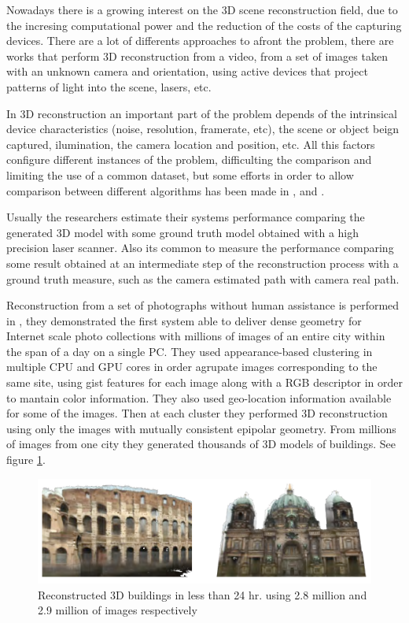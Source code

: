  
Nowadays there is a growing interest on the 3D scene reconstruction field, due to the incresing computational power and the reduction of 
the costs of the capturing devices. There are a lot of differents approaches to afront the problem, there are works that perform 3D reconstruction 
from a video, from a set of images taken with an unknown camera and orientation, using active devices that project patterns of light into 
the scene, lasers, etc. 

In 3D reconstruction an important part of the problem depends of the intrinsical 
device characteristics (noise, resolution, framerate, etc), the scene or object beign captured, ilumination, the camera location and position, etc. All this factors configure different instances of the problem, difficulting the comparison and limiting the use of a common dataset, but some efforts in order to allow comparison between different algorithms has been made 
in \cite{seitz2006}, \cite{ponce2006} and \cite{scharstein2001}.

Usually the researchers estimate their systems performance comparing the generated 3D model with some 
ground truth model obtained with a high precision laser scanner. Also its common to measure the performance
 comparing some result obtained at an intermediate step of the reconstruction process with a ground truth measure, 
such as the camera estimated path with camera real path.   

Reconstruction from a set of photographs without human assistance is performed in \cite{jan}, they demonstrated the first system able to deliver dense geometry for Internet scale photo collections with millions of images of an entire city within the span of a day on a single PC. They used appearance-based clustering in multiple CPU and GPU cores 
in order agrupate images corresponding to the same site, using gist features for each image along with a RGB
descriptor in order to mantain color information. They also used geo-location information available for some of 
the images. Then at each cluster they performed 3D reconstruction using only the images with mutually consistent epipolar 
geometry. From millions of images from one city they generated thousands of 3D models of buildings. See figure \ref{fig:jan}. 


\begin{figure}[h!]
\begin{center}
\includegraphics[scale=0.25]{images/jan}
\caption{Reconstructed 3D buildings in less than 24 hr. using 2.8 million and 2.9 million of images respectively}
\label{fig:jan}
\end{center}
\end{figure}

